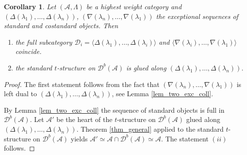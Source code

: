 \documentclass[12pt,a4paper]{amsart}
\newcommand{\aA}{{\mathcal{A}}}
\newcommand{\dD}{{\mathcal{D}}}
\newcommand{\la}{\lambda}
\newcommand{\kk}{\mathbbm{k}}
\newcommand{\tr}{{\mbox{$t$-struc}\-tu\-r}}
\newtheorem{COR}[LEM]{Corollary}
\theoremstyle{definition}
\begin{document}
\begin{COR}\label{cor_hwc_is_glued}
	Let $(\aA, \Lambda)$ be a highest weight category and $(\Delta(\la_1), \ldots, \Delta(\la_n))$, $(\nabla (\la_n), \ldots, \nabla(\la_1))$ the exceptional sequences of standard  and costandard objects. Then 
	\begin{enumerate}
		\item the full subcategory $\dD_i = \langle \Delta(\la_1), \ldots, \Delta(\la_i) \rangle$ and $ \langle \nabla(\la_i), \ldots, \nabla(\la_1) \rangle$ coincide.
		\item the standard \tr e on $\dD^b(\aA)$ is glued along $(\Delta(\la_1), \ldots, \Delta(\la_n))$.
	\end{enumerate}
%	
\end{COR}
\begin{proof}
The first statement follows from the fact that $(\nabla (\la_n), \ldots, \nabla(\la_1))$ is left dual to $(\Delta(\la_1), \ldots, \Delta(\la_n))$, see Lemma \ref{lem_two_exc_coll}.


	By Lemma \ref{lem_two_exc_coll} the sequence of standard objects is full in $\dD^b(\aA)$.  Let $\aA'$ be the heart of the \tr e on $\dD^b(\aA)$ glued along $(\Delta(\la_1), \ldots, \Delta(\la_n))$. Theorem \ref{thm_general} applied to the standard \tr e on $\dD^b(\aA)$ yields $\aA' \simeq \aA \cap \dD^b(\aA)\simeq \aA$. The statement $(ii)$ follows.
\end{proof}
\end{document}
